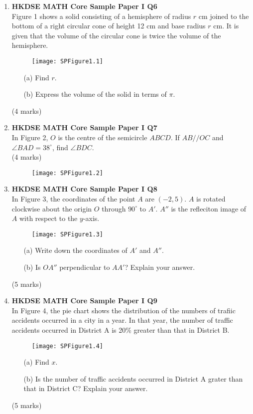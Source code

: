 \documentclass[12pt]{article}
\begin{document}
\begin{enumerate}
	\item \textbf{HKDSE MATH Core Sample Paper I Q6}\\
	Figure 1 shows a solid consisting of a hemisphere of radius $r$ cm joined to the bottom of a right circular cone of height 12 cm and base radius $r$ cm. It is given that the volume of the circular cone is twice the volume of the hemisphere.
	\begin{figure}[H]
		\centering
		\texttt{[image: SPFigure1.1]}
	\end{figure}
	\begin{enumerate}
		\item[(a)] Find $r$.
		\item[(b)] Express the volume of the solid in terms of $\pi$.
	\end{enumerate}
	(4 marks)

	\item \textbf{HKDSE MATH Core Sample Paper I Q7}\\
	In Figure 2, $O$ is the centre of the semicircle $ABCD$. If $AB//OC$ and $\angle BAD = 38^\circ$, find $\angle BDC$. \\(4 marks)
	\begin{figure}[H]
		\centering
		\texttt{[image: SPFigure1.2]}
	\end{figure}

	\item \textbf{HKDSE MATH Core Sample Paper I Q8}\\
	In Figure 3, the coordinates of the point $A$ are $(-2, 5)$. $A$ is rotated clockwise about the origin $O$ through $90^\circ$ to $A'$. $A''$ is the refleciton image of $A$ with respect to the $y$-axis.
	\begin{figure}[H]
		\centering
		\texttt{[image: SPFigure1.3]}
	\end{figure}
	\begin{enumerate}
		\item[(a)] Write down the coordinates of $A'$ and $A''$.
		\item[(b)] Is $OA''$ perpendicular to $AA'$? Explain your answer. 
	\end{enumerate}
	(5 marks)

	\item \textbf{HKDSE MATH Core Sample Paper I Q9}\\
	In Figure 4, the pie chart shows the distribution of the numbers of trafiic accidents occurred in a city in a year. In that year, the number of traffic accidents occurred in District A is 20\% greater than that in District B.
	\begin{figure}[H]
		\centering
		\texttt{[image: SPFigure1.4]}
	\end{figure}
	\begin{enumerate}
		\item[(a)] Find $x$.
		\item[(b)] Is the number of traffic accidents occurred in District A grater than that in District C? Explain your answer. 
	\end{enumerate}
	(5 marks)
	


\end{enumerate}
\end{document}
